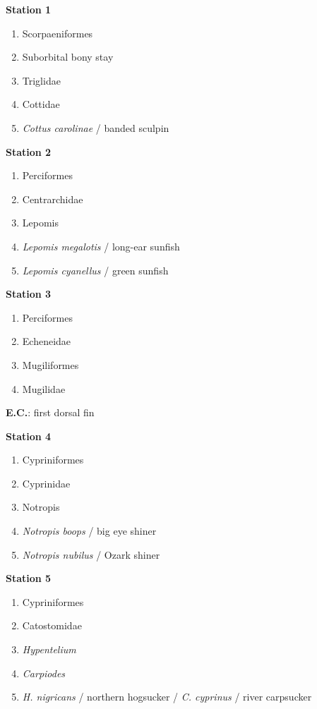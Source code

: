 \textbf{Station 1}

\begin{enumerate}
\def\labelenumi{\arabic{enumi}.}
\item
  Scorpaeniformes
\item
  Suborbital bony stay
\item
  Triglidae
\item
  Cottidae
\item
  \emph{Cottus carolinae} / banded sculpin
\end{enumerate}

\textbf{Station 2}

\begin{enumerate}
\def\labelenumi{\arabic{enumi}.}
\setcounter{enumi}{5}
\item
  Perciformes
\item
  Centrarchidae
\item
  Lepomis
\item
  \emph{Lepomis megalotis} / long-ear sunfish
\item
  \emph{Lepomis cyanellus} / green sunfish
\end{enumerate}

\textbf{Station 3}

\begin{enumerate}
\def\labelenumi{\arabic{enumi}.}
\setcounter{enumi}{10}
\item
  Perciformes
\item
  Echeneidae
\item
  Mugiliformes
\item
  Mugilidae
\end{enumerate}

\textbf{E.C.}: first dorsal fin

\textbf{Station 4}

\begin{enumerate}
\def\labelenumi{\arabic{enumi}.}
\setcounter{enumi}{14}
\item
  Cypriniformes
\item
  Cyprinidae
\item
  Notropis
\item
  \emph{Notropis boops} / big eye shiner
\item
  \emph{Notropis nubilus} / Ozark shiner
\end{enumerate}

\textbf{Station 5}

\begin{enumerate}
\def\labelenumi{\arabic{enumi}.}
\setcounter{enumi}{19}
\item
  Cypriniformes
\item
  Catostomidae
\item
  \emph{Hypentelium}
\item
  \emph{Carpiodes}
\item
  \emph{H. nigricans} / northern hogsucker / \emph{C. cyprinus} / river
  carpsucker
\end{enumerate}

